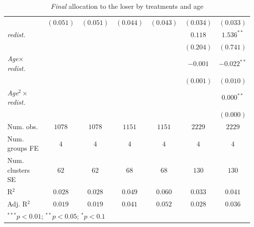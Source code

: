 \begin{table}[htpb]
\begin{center}
\begin{footnotesize}
\begin{tabular}{l c c c c c c}
                                       & $(0.051)$      & $(0.051)$      & $(0.044)$      & $(0.043)$      & $(0.034)$      & $(0.033)$      \\
\textit{redist.}                       &                &                &                &                & $0.118$        & $1.536^{**}$   \\
                                       &                &                &                &                & $(0.204)$      & $(0.741)$      \\
\textit{Age}$\times$\textit{redist.}   &                &                &                &                & $-0.001$       & $-0.022^{**}$  \\
                                       &                &                &                &                & $(0.001)$      & $(0.010)$      \\
\textit{Age}$^2\times$\textit{redist.} &                &                &                &                &                & $0.000^{**}$   \\
                                       &                &                &                &                &                & $(0.000)$      \\
\midrule
Num. obs.                              & $1078$         & $1078$         & $1151$         & $1151$         & $2229$         & $2229$         \\
Num. groups FE                         & $4$            & $4$            & $4$            & $4$            & $4$            & $4$            \\
Num. clusters SE                       & $62$           & $62$           & $68$           & $68$           & $130$          & $130$          \\
R$^2$                                  & $0.028$        & $0.028$        & $0.049$        & $0.060$        & $0.033$        & $0.041$        \\
Adj. R$^2$                             & $0.019$        & $0.019$        & $0.041$        & $0.052$        & $0.028$        & $0.036$        \\
\bottomrule
\multicolumn{7}{l}{\footnotesize{$^{***}p<0.01$; $^{**}p<0.05$; $^{*}p<0.1$}}
\end{tabular}
\end{footnotesize}
\caption{\textit{Final} allocation to the loser by treatments and age}
\label{table-age-final}
\end{center}
\end{table}


